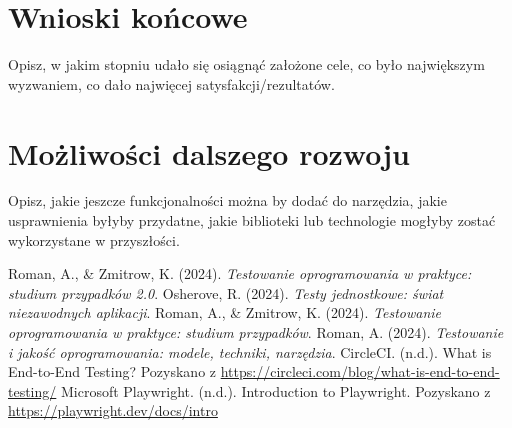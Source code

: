 \documentclass[12pt]{report}
\begin{document}
\section{Wnioski końcowe}
{Opisz, w jakim stopniu udało się osiągnąć założone cele, co było największym wyzwaniem, co dało najwięcej satysfakcji/rezultatów.}

\section{Możliwości dalszego rozwoju}
{Opisz, jakie jeszcze funkcjonalności można by dodać do narzędzia, jakie usprawnienia byłyby przydatne, jakie biblioteki lub technologie mogłyby zostać wykorzystane w przyszłości.}

\begin{thebibliography}{9}
     Roman, A., \& Zmitrow, K. (2024). \textit{Testowanie oprogramowania w praktyce: studium przypadków 2.0}.
     Osherove, R. (2024). \textit{Testy jednostkowe: świat niezawodnych aplikacji}.
     Roman, A., \& Zmitrow, K. (2024). \textit{Testowanie oprogramowania w praktyce: studium przypadków}.
     Roman, A. (2024). \textit{Testowanie i jakość oprogramowania: modele, techniki, narzędzia}.
     CircleCI. (n.d.). What is End-to-End Testing? Pozyskano z \url{https://circleci.com/blog/what-is-end-to-end-testing/}
     Microsoft Playwright. (n.d.). Introduction to Playwright. Pozyskano z \url{https://playwright.dev/docs/intro}
\end{thebibliography}
\end{document}
